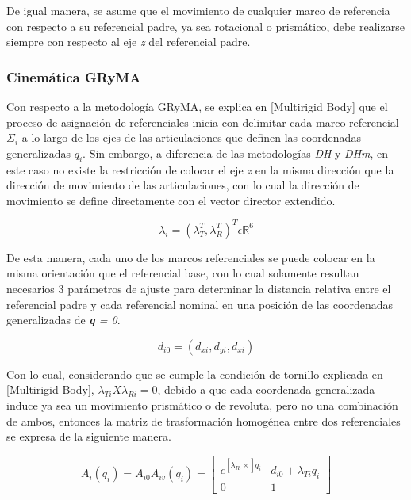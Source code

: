         De igual manera, se asume que el movimiento de cualquier marco de referencia con respecto 
        a su referencial padre, ya sea rotacional o prismático, debe realizarse siempre con respecto 
        al eje \emph{z} del referencial padre.

    \subsubsection{Cinemática GRyMA}
        Con respecto a la metodología GRyMA, se explica en [Multirigid Body] que el proceso de asignación 
        de referenciales inicia con delimitar cada marco referencial $\Sigma_i$ a lo largo de los ejes 
        de las articulaciones que definen las coordenadas generalizadas $q_i$. Sin embargo, a 
        diferencia de las metodologías \emph{DH} y \emph{DHm}, en este caso no existe la 
        restricción de colocar el eje \emph{z} en la misma dirección que la dirección de movimiento de las 
        articulaciones, con lo cual la dirección de movimiento se define directamente con el 
        vector director extendido.

        \begin{equation*}
            \lambda_i = (\lambda^T_T, \lambda^T_R)^T \epsilon \mathbb{R}^6
        \end{equation*}

        De esta manera, cada uno de los marcos referenciales se puede colocar en la misma 
        orientación que el referencial base, con lo cual solamente resultan necesarios 3 
        parámetros de ajuste para determinar la distancia relativa entre el referencial 
        padre y cada referencial nominal en una posición de las coordenadas generalizadas de 
        \emph{\textbf{q} = 0}.

        \begin{equation*}
            d_{i0} = (d_{xi}, d_{yi}, d_{xi})
        \end{equation*}

        Con lo cual, considerando que se cumple la condición de tornillo explicada en [Multirigid Body], 
        $\lambda_{Ti} X \lambda_{Ri} = 0$, debido a que cada coordenada generalizada 
        induce ya sea un movimiento prismático o de revoluta, pero no una combinación de ambos, 
        entonces la matriz de trasformación homogénea entre dos referenciales se 
        expresa de la siguiente manera.
        
        \begin{equation*}
            A_i(q_i) = A_{i0} A_{iv}(q_i) = 
            \begin{bmatrix}
                e^{[\lambda_{R_i}\times]q_i} & d_{i0} + \lambda_{Ti}q_i\\
                0 & 1
            \end{bmatrix}
        \end{equation*}

